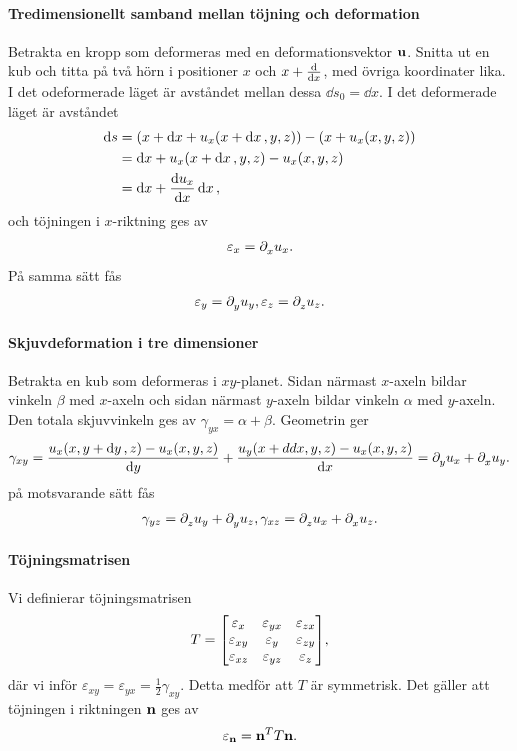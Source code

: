 \paragraph{Tredimensionellt samband mellan töjning och deformation}
Betrakta en kropp som deformeras med en deformationsvektor $\vb{u}$. Snitta ut en kub och titta på två hörn i positioner $x$ och $x + \dv{x}$, med övriga koordinater lika. I det odeformerade läget är avståndet mellan dessa $\dd{s_{0}} = \dd{x}$. I det deformerade läget är avståndet
\begin{align*}
	\dd{s} &= (x + \dd{x} + u_{x}(x + \dd{x}, y, z)) - (x + u_{x}(x, y, z)) \\
	       &= \dd{x} + u_{x}(x + \dd{x}, y, z) - u_{x}(x, y, z) \\
	       &= \dd{x} + \dv{u_{x}}{x}\dd{x},
\end{align*}
och töjningen i $x$-riktning ges av
\begin{align*}
	\varepsilon_{x} = \partial_{x}^{}u_{x}.
\end{align*}
På samma sätt fås
\begin{align*}
	\varepsilon_{y} = \partial_{y}^{}u_{y}, \varepsilon_{z} = \partial_{z}^{}u_{z}.
\end{align*}

\paragraph{Skjuvdeformation i tre dimensioner}
Betrakta en kub som deformeras i $xy$-planet. Sidan närmast $x$-axeln bildar vinkeln $\beta$ med $x$-axeln och sidan närmast $y$-axeln bildar vinkeln $\alpha$ med $y$-axeln. Den totala skjuvvinkeln ges av $\gamma_{yx} = \alpha + \beta$. Geometrin ger
\begin{align*}
	\gamma_{xy} = \frac{u_{x}(x, y + \dd{y}, z) - u_{x}(x, y, z)}{\dd{y}} + \frac{u_{y}(x + dd{x}, y, z) - u_{x}(x, y, z)}{\dd{x}} = \partial_{y}^{}u_{x} + \partial_{x}^{}u_{y}.
\end{align*}
på motsvarande sätt fås
\begin{align*}
	\gamma_{yz} = \partial_{z}^{}u_{y} + \partial_{y}^{}u_{z}, \gamma_{xz} = \partial_{z}^{}u_{x} + \partial_{x}^{}u_{z}.
\end{align*}

\paragraph{Töjningsmatrisen}
Vi definierar töjningsmatrisen
\begin{align*}
	T =
	\mqty[
		\varepsilon_{x}  & \varepsilon_{yx} & \varepsilon_{zx} \\
		\varepsilon_{xy} & \varepsilon_{y}  & \varepsilon_{zy} \\
		\varepsilon_{xz} & \varepsilon_{yz} & \varepsilon_{z}
	],
\end{align*}
där vi inför $\varepsilon_{xy} = \varepsilon_{yx} = \frac{1}{2}\gamma_{xy}$. Detta medför att $T$ är symmetrisk. Det gäller att töjningen i riktningen $\vb{n}$ ges av
\begin{align*}
	\varepsilon_{\vb{n}} = \vb{n}^{T}T\vb{n}.
\end{align*}

